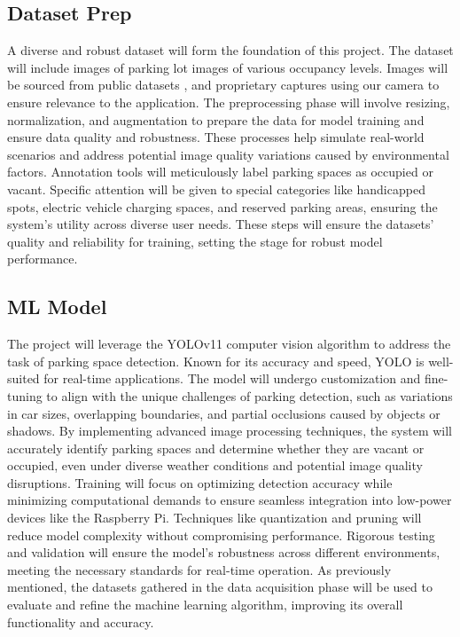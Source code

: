 \documentclass[conference]{IEEEtran}
\begin{document}
\subsection{Dataset Prep}

A diverse and robust dataset will form the foundation of this project. 
The dataset will include images of parking lot images of various occupancy levels. 
Images will be sourced from public datasets \cite{dataset_images}, \cite{images_original} and proprietary captures using our camera to ensure relevance to the application. 
The preprocessing phase will involve resizing, 
normalization, 
and augmentation to prepare the data for model training and ensure data quality and robustness. 
These processes help simulate real-world scenarios and address potential image quality variations caused by environmental factors. 
Annotation tools will meticulously label parking spaces as occupied or vacant. 
Specific attention will be given to special categories like handicapped spots, 
electric vehicle charging spaces, 
and reserved parking areas, 
ensuring the system’s utility across diverse user needs. 
These steps will ensure the datasets’ quality and reliability for training, 
setting the stage for robust model performance.

\subsection{ML Model}

The project will leverage the YOLOv11 computer vision algorithm \cite{yolo11_ultralytics} to address the task of parking space detection. 
Known for its accuracy and speed, 
YOLO is well-suited for real-time applications.
The model will undergo customization and fine-tuning to align with the unique challenges of parking detection, 
such as variations in car sizes, 
overlapping boundaries, 
and partial occlusions caused by objects or shadows. 
By implementing advanced image processing techniques, 
the system will accurately identify parking spaces and determine whether they are vacant or occupied, 
even under diverse weather conditions and potential image quality disruptions. 
Training will focus on optimizing detection accuracy while minimizing computational demands to ensure seamless integration into low-power devices like the Raspberry Pi. 
Techniques like quantization and pruning will reduce model complexity without compromising performance. 
Rigorous testing and validation will ensure the model’s robustness across different environments, 
meeting the necessary standards for real-time operation. 
As previously mentioned, 
the datasets gathered in the data acquisition phase will be used to evaluate and refine the machine learning algorithm, 
improving its overall functionality and accuracy.
\end{document}
